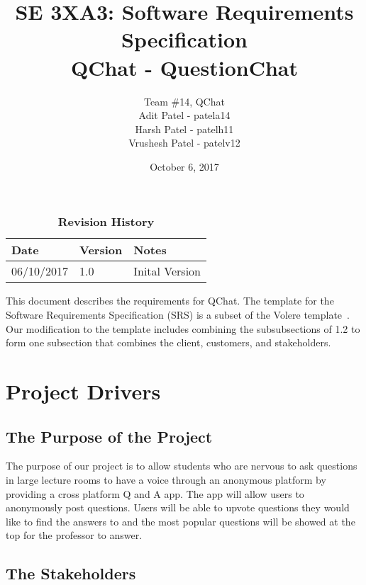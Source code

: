 \documentclass[12pt, titlepage]{article}
\title{SE 3XA3: Software Requirements Specification\\QChat - QuestionChat}
\author{Team \#14, QChat
		\\ Adit Patel - patela14
		\\ Harsh Patel - patelh11
		\\ Vrushesh Patel - patelv12
}
\date{October 6, 2017}
\begin{document}
\maketitle

\tableofcontents
\listoftables

\begin{table}[bp]
\caption{\bf Revision History}
\begin{tabularx}{\textwidth}{p{3cm}p{2cm}X}
\toprule {\bf Date} & {\bf Version} & {\bf Notes}\\
\midrule
06/10/2017 & 1.0 & Inital Version\\
\bottomrule
\end{tabularx}
\end{table}

\newpage


This document describes the requirements for QChat.  The template for the Software
Requirements Specification (SRS) is a subset of the Volere
template~\citep{RobertsonAndRobertson2012}. Our modification to the template includes combining the subsubsections of 1.2 to form one subsection that combines the client, customers, and stakeholders.

\section{Project Drivers}

\subsection{The Purpose of the Project}
The purpose of our project is to allow students who are nervous to ask questions in large lecture rooms to have a voice through an anonymous platform by providing a cross platform Q and A app. The app will allow users to anonymously post questions. Users will be able to upvote questions they would like to find the answers to and the most popular questions will be showed at the top for the professor to answer.

\subsection{The Stakeholders}
\end{document}
